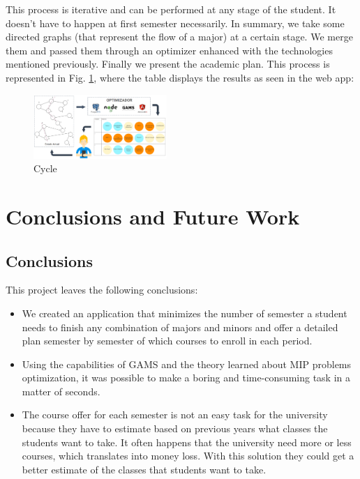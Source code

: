 \documentclass[journal]{IEEEtran}
\begin{document}
This process is iterative and can be performed at any stage of the student. It doesn't have to happen at first semester necessarily. In summary, we take some directed graphs (that represent the flow of a major) at a certain stage. We merge them and passed them through an optimizer enhanced with the technologies mentioned previously. Finally we present the academic plan. This process is represented in Fig. \ref{cycle}, where the table displays the results as seen in the web app:

\begin{figure}[h!]
    \centering
    \includegraphics[width=0.45\textwidth]{img/cycle}
    \caption{Cycle}
    \label{cycle}
\end{figure}


\section{Conclusions and Future Work }

\subsection{Conclusions}

This project leaves the following conclusions:\\

\begin{itemize}
    \item We created an application that minimizes the number of semester a student needs to finish any combination of majors and minors and offer a detailed plan semester by semester of which courses to enroll in each period. \\
    \item Using the capabilities of GAMS and the theory learned about MIP problems optimization, it was possible to make a boring and time-consuming task in a matter of seconds.\\
    \item The course offer for each semester is not an easy task for the university because they have to estimate based on previous years what classes the students want to take. It often happens that the university need more or less courses, which translates into money loss. With this solution they could get a better estimate of the classes that students want to take. \\
\end{itemize}
\end{document}
